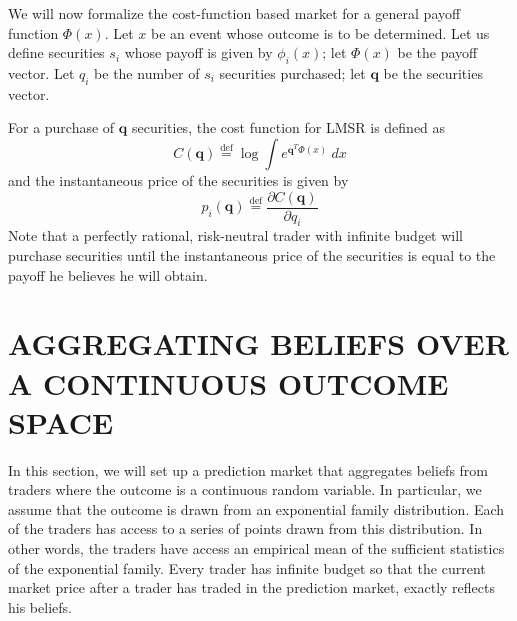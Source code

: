 \documentclass{article}
\newcommand{\qvec}{\mathbf{q}}
\newcommand{\defeq}{\stackrel{\mathrm{def}}{=}}
\begin{document}
We will now formalize the cost-function based market for a general payoff function $\Phi(x)$. Let $x$ be an event whose outcome is to be determined. Let us define securities $s_i$ whose payoff is given by $\phi_{i}(x)$; let $\Phi(x)$ be the payoff vector. Let $q_i$ be the  number of $s_i$ securities purchased; let  $\qvec$ be the securities vector. 

For a purchase of $\qvec$ securities, the cost function for LMSR is defined as 
$$C(\qvec)\defeq \log \int e^{\qvec^{T}\Phi(x)}\ dx$$
and the instantaneous price of the securities is given by $$p_i(\qvec)\defeq\frac{\partial C(\qvec)}{\partial q_i}$$
Note that a perfectly rational, risk-neutral trader with infinite budget will purchase securities until the instantaneous price of the securities is equal to the payoff he believes he will obtain.

\section{AGGREGATING BELIEFS OVER A CONTINUOUS OUTCOME SPACE}
In this section, we will set up a prediction market that aggregates beliefs from traders where the outcome is a continuous random variable. In particular, we assume that the outcome is drawn from an exponential family distribution. Each of the traders has access to a series of points drawn from this distribution. In other words, the traders have access an empirical mean of the sufficient statistics of the exponential family. Every trader has infinite budget so that the current market price after a trader has traded in the prediction market, exactly reflects his beliefs.

\end{document}
